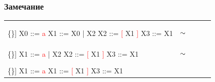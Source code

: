 \documentclass{beamer}
\begin{document}
\begin{frame}[fragile]
	\transwipe[direction=90]
	\frametitle{Замечание}
	\begin{table}
	\centering
		\begin{tabular}{p{3cm} p{0.5cm} p{3cm} p{0.5cm} p{3cm}}
				\vspace{5pt}
				\begin{Verbatim}[commandchars=\\\{\}]
X0 ::= \textcolor{red}{a}
X1 ::= X0 | X2
X2 ::= \textcolor{red}{[} X1 \textcolor{red}{]} 
X3 ::= X1
				\end{Verbatim}
				&
				\pause
				$$\Huge {\sim}$$
				&
				\vspace{10pt}
				\begin{Verbatim}[commandchars=\\\{\}]
X1 ::= \textcolor{red}{a} | X2
X2 ::= \textcolor{red}{[} X1 \textcolor{red}{]} 
X3 ::= X1
				\end{Verbatim}
				&
				\pause
				$$\Huge{\sim}$$
				&
				\vspace{10pt}
				\begin{Verbatim}[commandchars=\\\{\}]
X1 ::= \textcolor{red}{a}
X1 ::= \textcolor{red}{[} X1 \textcolor{red}{]} 
X3 ::= X1
				\end{Verbatim}
		\end{tabular}
	\end{table}
\end{frame}
\end{document}
